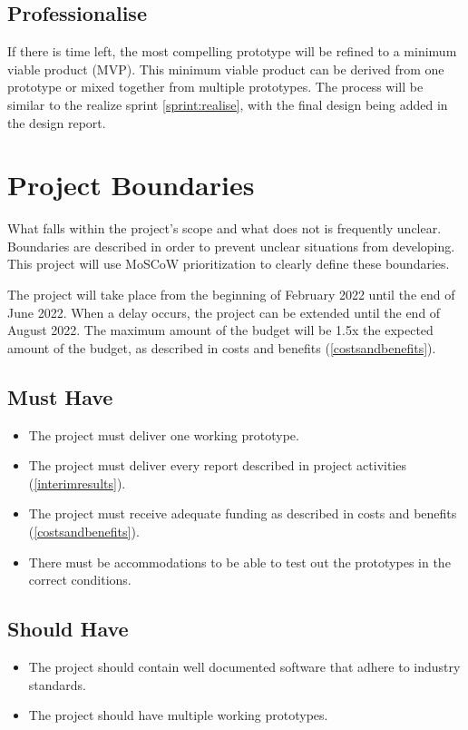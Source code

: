 \documentclass[11pt, a4paper]{article}
\begin{document}
\subsection{Professionalise} \label{sprint:professionalise}
If there is time left, the most compelling prototype will be refined to a minimum viable product (MVP). \cite{mvp} This minimum viable product can be derived from one prototype or mixed together from multiple prototypes. The process will be similar to the realize sprint \ref{sprint:realise}, with the final design being added in the design report.

\section{Project Boundaries} \label{projectboundaries}
What falls within the project’s scope and what does not is frequently  unclear. Boundaries are described in order to prevent unclear situations from developing. This project will use MoSCoW prioritization to clearly define these boundaries. \cite{moscow}

The project will take place from the beginning of February 2022 until the end of June 2022. When a delay occurs, the project can be extended until the end of August 2022. The maximum amount of the budget will be 1.5x the expected amount of the budget, as described in costs and benefits (\ref{costsandbenefits}).

\subsection{Must Have}
\begin{itemize}
  \item The project must deliver one working prototype.
  \item The project must deliver every report described in project activities (\ref{interimresults}).
  \item The project must receive adequate funding as described in costs and benefits (\ref{costsandbenefits}).
  \item There must be accommodations to be able to test out the prototypes in the correct conditions.
\end{itemize}
\subsection{Should Have}
\begin{itemize}
  \item The project should contain well documented software that adhere to industry standards.
  \item The project should have multiple working prototypes.
\end{itemize}
\end{document}
